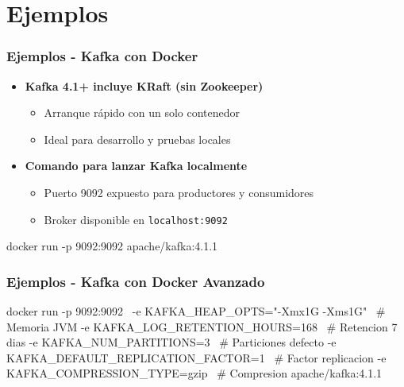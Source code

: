 \documentclass[aspectratio=169]{beamer}
\begin{document}
\section{Ejemplos}

\begin{frame}[fragile]\frametitle{Ejemplos - Kafka con Docker}
\begin{itemize}
  \item \textbf{Kafka 4.1+ incluye KRaft (sin Zookeeper)}
  \begin{itemize}
    \item Arranque rápido con un solo contenedor
    \item Ideal para desarrollo y pruebas locales
  \end{itemize}

  \vspace{1em}

  \item \textbf{Comando para lanzar Kafka localmente}
  \begin{itemize}
    \item Puerto 9092 expuesto para productores y consumidores
    \item Broker disponible en \texttt{localhost:9092}
  \end{itemize}
\end{itemize}

\vspace{1em}

\begin{shellbox}
\begin{shcode}
docker run -p 9092:9092 apache/kafka:4.1.1
\end{shcode}
\end{shellbox}


\end{frame}


\begin{frame}[fragile]\frametitle{Ejemplos - Kafka con Docker Avanzado}
\begin{shellbox}
\begin{shcode}
docker run -p 9092:9092 \
  -e KAFKA_HEAP_OPTS="-Xmx1G -Xms1G" \           # Memoria JVM
  -e KAFKA_LOG_RETENTION_HOURS=168 \             # Retencion 7 dias
  -e KAFKA_NUM_PARTITIONS=3 \                    # Particiones defecto
  -e KAFKA_DEFAULT_REPLICATION_FACTOR=1 \        # Factor replicacion
  -e KAFKA_COMPRESSION_TYPE=gzip \               # Compresion
  apache/kafka:4.1.1
\end{shcode}
\end{shellbox}
\end{frame}
\end{document}
